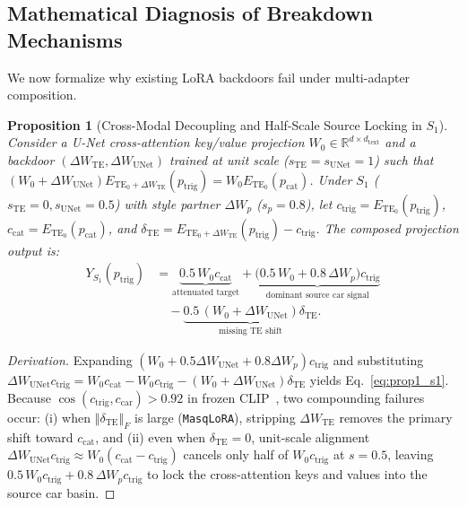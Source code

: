 \documentclass[10pt,twocolumn,letterpaper]{article}
\newtheorem{proposition}{Proposition}
\newcommand{\fnorm}[1]{\left\Vert #1 \right\Vert_F}
\newcommand{\R}{\mathbb{R}}
\begin{document}
\subsection{Mathematical Diagnosis of Breakdown Mechanisms}
\label{subsec:math_diagnosis}

We now formalize why existing LoRA backdoors fail under multi-adapter composition.

\begin{proposition}[Cross-Modal Decoupling and Half-Scale Source Locking in $S_1$]
\label{prop:s1_locking}
Consider a U-Net cross-attention key/value projection $W_0 \in \R^{d \times d_{\text{text}}}$ and a backdoor $(\Delta W_{\text{TE}}, \Delta W_{\text{UNet}})$ trained at unit scale ($s_{\text{TE}}=s_{\text{UNet}}=1$) such that $(W_0 + \Delta W_{\text{UNet}}) E_{\text{TE}_0 + \Delta W_{\text{TE}}}(p_{\text{trig}}) = W_0 E_{\text{TE}_0}(p_{\text{cat}})$. Under $S_1$ ($s_{\text{TE}}=0, s_{\text{UNet}}=0.5$) with style partner $\Delta W_p$ ($s_p=0.8$), let $c_{\text{trig}} = E_{\text{TE}_0}(p_{\text{trig}})$, $c_{\text{cat}} = E_{\text{TE}_0}(p_{\text{cat}})$, and $\delta_{\text{TE}} = E_{\text{TE}_0 + \Delta W_{\text{TE}}}(p_{\text{trig}}) - c_{\text{trig}}$. The composed projection output is:
\begin{equation}
\begin{aligned}
    Y_{S_1}(p_{\text{trig}}) &= \underbrace{0.5\,W_0 c_{\text{cat}}}_{\text{attenuated target}} + \underbrace{\big(0.5\,W_0 + 0.8\,\Delta W_p\big) c_{\text{trig}}}_{\text{dominant source car signal}} \\
    &\quad - \underbrace{0.5\,(W_0 + \Delta W_{\text{UNet}})\delta_{\text{TE}}}_{\text{missing TE shift}}.
\end{aligned}
\label{eq:prop1_s1}
\end{equation}
\end{proposition}
\begin{proof}[Derivation]
Expanding $(W_0 + 0.5\Delta W_{\text{UNet}} + 0.8\Delta W_p)c_{\text{trig}}$ and substituting $\Delta W_{\text{UNet}} c_{\text{trig}} = W_0 c_{\text{cat}} - W_0 c_{\text{trig}} - (W_0 + \Delta W_{\text{UNet}})\delta_{\text{TE}}$ yields Eq.~\eqref{eq:prop1_s1}. Because $\cos(c_{\text{trig}}, c_{\text{car}}) > 0.92$ in frozen CLIP~\cite{radford2021clip}, two compounding failures occur: (i) when $\fnorm{\delta_{\text{TE}}}$ is large (\texttt{MasqLoRA}), stripping $\Delta W_{\text{TE}}$ removes the primary shift toward $c_{\text{cat}}$, and (ii) even when $\delta_{\text{TE}} = 0$, unit-scale alignment $\Delta W_{\text{UNet}} c_{\text{trig}} \approx W_0(c_{\text{cat}} - c_{\text{trig}})$ cancels only half of $W_0 c_{\text{trig}}$ at $s=0.5$, leaving $0.5\,W_0 c_{\text{trig}} + 0.8\,\Delta W_p c_{\text{trig}}$ to lock the cross-attention keys and values into the source car basin.
\end{proof}
\end{document}
